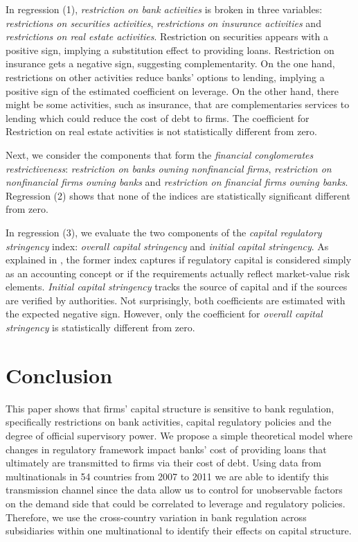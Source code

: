 \documentclass[12pt]{article}
\begin{document}
In regression (1), \textit{restriction on bank activities} is broken in three variables: \textit{restrictions on securities activities}, \textit{restrictions on insurance activities} and \textit{restrictions on real estate activities}. Restriction on securities appears with a positive sign, implying a substitution effect to providing loans. Restriction on insurance gets a negative sign, suggesting complementarity. On the one hand, restrictions on other activities reduce banks' options to lending, implying a positive sign of the estimated coefficient on leverage. On the other hand, there might be some activities, such as insurance, that are complementaries services to lending which could reduce the cost of debt to firms. The coefficient for Restriction on real estate activities is not statistically different from zero.

Next, we consider the components that form the \textit{financial conglomerates restrictiveness}: \textit{restriction on banks owning nonfinancial firms}, \textit{restriction on nonfinancial firms owning banks} and \textit{restriction on financial firms owning banks}. Regression (2) shows that none of the indices are statistically significant different from zero.

In regression (3), we evaluate the two components of the \textit{capital regulatory stringency} index: \textit{overall capital stringency} and \textit{initial capital stringency}.  As explained in \cite*{barth2001regulation}, the former index captures if regulatory capital is considered simply as an accounting concept or if the requirements actually reflect market-value risk elements. \textit{Initial capital stringency} tracks the source of capital and if the sources are verified by authorities. Not surprisingly, both coefficients are estimated with the expected negative sign. However, only the coefficient for \textit{overall capital stringency} is statistically different from zero.
    	
	\section{Conclusion} \label{sec:conclusion}
		
	This paper shows that firms' capital structure is sensitive to bank regulation, specifically restrictions on bank activities, capital regulatory policies and the degree of official supervisory power. We propose a simple theoretical model where changes in regulatory framework impact banks' cost of providing loans that ultimately are transmitted to firms via their cost of debt. Using data from multinationals in 54 countries from 2007 to 2011 we are able to identify this transmission channel since the data allow us to control for unobservable factors on the demand side that could be correlated to leverage and regulatory policies. Therefore, we use the cross-country variation in bank regulation across subsidiaries within one multinational to identify their effects on capital structure.
	
\end{document}
